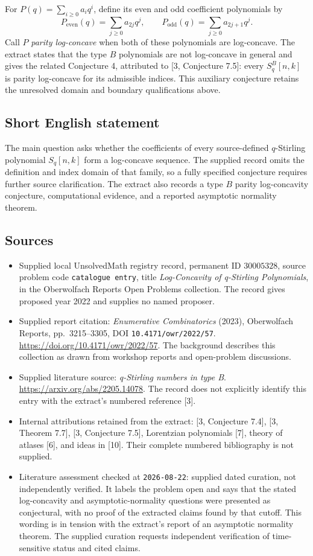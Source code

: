 \documentclass[11pt]{article}
\begin{document}
For \(P(q)=\sum_{i\geq0}a_iq^i\), define its even and odd coefficient polynomials by
\[
P_{\mathrm{even}}(q)=\sum_{j\geq0}a_{2j}q^j,
\qquad
P_{\mathrm{odd}}(q)=\sum_{j\geq0}a_{2j+1}q^j.
\]
Call \(P\) \emph{parity log-concave} when both of these polynomials are log-concave. The extract states that the type \(B\) polynomials are not log-concave in general and gives the related Conjecture 4, attributed to [3, Conjecture 7.5]: every \(S_q^B[n,k]\) is parity log-concave for its admissible indices. This auxiliary conjecture retains the unresolved domain and boundary qualifications above.
\subsection{Short English statement}
The main question asks whether the coefficients of every source-defined \(q\)-Stirling polynomial \(S_q[n,k]\) form a log-concave sequence. The supplied record omits the definition and index domain of that family, so a fully specified conjecture requires further source clarification. The extract also records a type \(B\) parity log-concavity conjecture, computational evidence, and a reported asymptotic normality theorem.
\subsection{Sources}
\begin{itemize}
\item Supplied local UnsolvedMath registry record, permanent ID \(30005328\), source problem code \texttt{catalogue entry}, title \emph{Log-Concavity of q-Stirling Polynomials}, in the Oberwolfach Reports Open Problems collection. The record gives proposed year 2022 and supplies no named proposer.
\item Supplied report citation: \emph{Enumerative Combinatorics} (2023), Oberwolfach Reports, pp.\ 3215--3305, DOI \texttt{10.4171/owr/2022/57}. \url{https://doi.org/10.4171/owr/2022/57}. The background describes this collection as drawn from workshop reports and open-problem discussions.
\item Supplied literature source: \emph{q-Stirling numbers in type B}. \url{https://arxiv.org/abs/2205.14078}. The record does not explicitly identify this entry with the extract's numbered reference [3].
\item Internal attributions retained from the extract: [3, Conjecture 7.4], [3, Theorem 7.7], [3, Conjecture 7.5], Lorentzian polynomials [7], theory of atlases [6], and ideas in [10]. Their complete numbered bibliography is not supplied.
\item Literature assessment checked at \texttt{2026-08-22}: supplied dated curation, not independently verified. It labels the problem open and says that the stated log-concavity and asymptotic-normality questions were presented as conjectural, with no proof of the extracted claims found by that cutoff. This wording is in tension with the extract's report of an asymptotic normality theorem. The supplied curation requests independent verification of time-sensitive status and cited claims.
\end{itemize}
\end{document}
